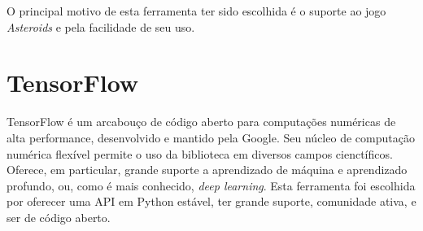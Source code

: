 O principal motivo de esta ferramenta ter sido escolhida é o suporte ao jogo \textit{Asteroids} e pela facilidade de seu uso.

\section{TensorFlow}
\label{sec:tensorflow}

TensorFlow é um arcabouço de código aberto para computações numéricas de alta performance, desenvolvido e mantido pela Google. Seu núcleo de computação numérica flexível permite o uso da biblioteca em diversos campos cienctíficos. Oferece, em particular, grande suporte a aprendizado de máquina e aprendizado profundo, ou, como é mais conhecido, \textit{deep learning}.
Esta ferramenta foi escolhida por oferecer uma API em Python estável, ter grande suporte, comunidade ativa, e ser de código aberto.

